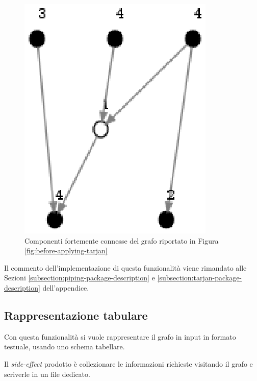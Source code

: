 \begin{figure}
  \centering
  \includegraphics{images/OnePipingLevelUnitTest_Printer_DFS_PrinterPipe_Crescenzi-phase-PrinterPipeFilter-level-2.eps}
  \caption{Componenti fortemente connesse del grafo riportato in
    Figura \ref{fig:before-applying-tarjan}}
  \label{fig:tarjan-output}
\end{figure}

Il commento dell'implementazione di questa funzionalit\`a viene
rimandato alle Sezioni \ref{subsection:piping-package-description} e
\ref{subsection:tarjan-package-description} dell'appendice.

\subsection{Rappresentazione tabulare}
Con questa funzionalit\`a si vuole rappresentare il grafo in input in
formato testuale, usando uno schema tabellare.

Il \emph{side-effect} prodotto \`e collezionare le informazioni
richieste visitando il grafo e scriverle in un file dedicato.

